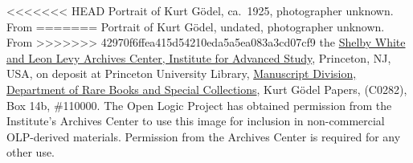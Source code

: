<<<<<<< HEAD
Portrait of Kurt G\"odel, ca.~1925, photographer unknown. From
=======
Portrait of Kurt G\"odel, undated, photographer unknown. From
>>>>>>> 42970f6ffea415d54210eda5a5ea083a3cd07cf9
the \href{https://library.ias.edu/archives}{Shelby White and Leon Levy
Archives Center, Institute for Advanced Study}, Princeton, NJ, USA, on
deposit at Princeton University
Library, \href{http://rbsc.princeton.edu/divisions/manuscripts-division}{Manuscript
Division, Department of Rare Books and Special Collections}, Kurt
G\"odel Papers, (C0282), Box 14b, \#110000.  The Open Logic Project
has obtained permission from the Institute's Archives Center to use
this image for inclusion in non-commercial OLP-derived materials.
Permission from the Archives Center is required for any other use.
